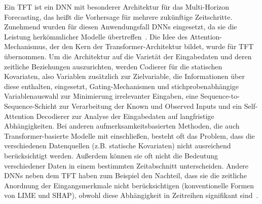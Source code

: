 Ein \ac{TFT} ist ein \ac{DNN} mit besonderer Architektur für das Multi-Horizon Forecasting, das heißt die Vorhersage für mehrere zukünftige Zeitschritte.
Zunehmend wurden für diesen Anwendungsfall \acp{DNN} eingesetzt, da sie die Leistung herkömmlicher Modelle übertreffen~\cite{Lim.19.12.2019}.
Die Idee des Attention-Mechanismus, der den Kern der Transformer-Architektur bildet, wurde für \ac{TFT} übernommen.
Um die Architektur auf die Varietät der Eingabedaten und deren zeitliche Beziehungen auszurichten, werden Codierer für die statischen Kovariaten, also Variablen zusätzlich zur Zielvariable, die Informationen über diese enthalten, eingesetzt, Gating-Mechanismen und stichprobenabhängige Variablenauswahl zur Minimierung irrelevanter Eingaben, eine Sequence-to-Sequence-Schicht zur Verarbeitung der Known und Observed Inputs und ein Self-Attention Decodierer zur Analyse der Eingabedaten auf langfristige Abhängigkeiten.
Bei anderen aufmerksamkeitsbasierten Methoden, die auch Transformer-basierte Modelle mit einschließen, besteht oft das Problem, dass die verschiedenen Datenquellen (z.B. statische Kovariaten) nicht ausreichend berücksichtigt werden.
Außerdem können sie oft nicht die Bedeutung verschiedener Daten in einem bestimmten Zeitabschnitt unterscheiden.
Andere \acp{DNN} neben dem \ac{TFT} haben zum Beispiel den Nachteil, dass sie die zeitliche Anordnung der Eingangsmerkmale nicht berücksichtigen (konventionelle Formen von LIME und SHAP), obwohl diese Abhängigkeit in Zeitreihen signifikant sind~\cite{Lim.19.12.2019}.

